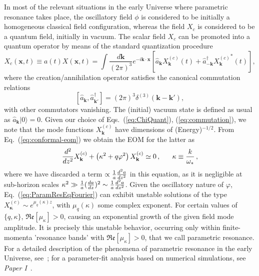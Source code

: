 \documentclass[a4paper,11pt]{article}
\begin{document}
In most of the relevant situations in the early Universe where parametric resonance takes place, the oscillatory field $\phi$ is considered to be initially a homogeneous classical field configuration, whereas the field $X_c$ is considered to be a quantum field, initially in vacuum. The scalar field $X_c$ can be promoted into a quantum operator by means of the standard quantization procedure
\begin{equation}
\label{eq:ChiQuant}
X_c (\mathbf{x},t) \equiv a(t)X(\mathbf{x},t) = \int\frac{d  \mathbf{k}}{\left(2\pi\right)^{3}}e^{-i\mathbf{k\cdot x}}\left[\hat{a}_{\mathbf{k}}X^{(c)}_{\mathbf{k}}(t)+\hat{a}_{-\mathbf{k}}^{\dagger}{X^{(c)}_{\mathbf{k}}}^{*}(t)\right],
\end{equation}
where the creation/annihilation operator satisfies the canonical commutation relations 
\begin{equation}\label{eq:commutation}
[\hat{a}_{\mathbf{k}},\hat{a}_{\mathbf{k'}}^{\dagger}]=\left(2\pi\right)^{3}\delta^{(3)}(\mathbf{k-k'}),
\end{equation}
with other commutators vanishing. The (initial) vacuum state is defined as usual as $\hat{a}_{\mathbf{k}}|0\rangle = 0$. Given our choice of Eqs.~(\ref{eq:ChiQuant}), (\ref{eq:commutation}), we note that the mode functions $X^{(c)}_{\mathbf{k}}$ have dimensions of (Energy)$^{-1/2}$. From Eq.~(\ref{eq:conformal-eom}) we obtain the EOM for the latter as
\begin{equation}\label{eq:ParamResEqFourier}
{d^2\over dz^2}X^{(c)}_{\mathbf{k}} + \left(\kappa^{2} + q \varphi^2\right)X^{(c)}_{\mathbf{k}} \simeq 0\,,~~~~~ \kappa \equiv {k\over \omega_{*}}\,,
\end{equation}
where we have discarded a term $\propto {1\over a}{d^2a\over dz^2}$ in this equation, as it is negligible at sub-horizon scales $\kappa^2 \gg {1\over a}({da\over dz})^2 \sim {1\over a}{d^2a\over dz^2}$. Given the oscillatory nature of $\varphi$, Eq.~(\ref{eq:ParamResEqFourier}) can exhibit unstable solutions of the type $X^{(c)}_{\mathbf{\kappa}} \sim e^{\mu_q({\kappa}) z}$, with $\mu_q({\kappa})$ some complex exponent. For certain values of $\lbrace q, \kappa\rbrace$, $\mathfrak{Re} [\mu_{\kappa}] > 0$, causing an exponential growth of the given field mode amplitude. It is precisely this unstable behavior, occurring only within finite-momenta 'resonance bands' with $\mathfrak{Re} [\mu_{\kappa}] > 0$, that we call parametric resonance. For a detailed description of the phenomena of parametric resonance in the early Universe, see~\cite{Amin:2014eta}; for a parameter-fit analysis based on numerical simulations, see {\it Paper I}~\cite{Figueroa:2016wxr}.
\end{document}
